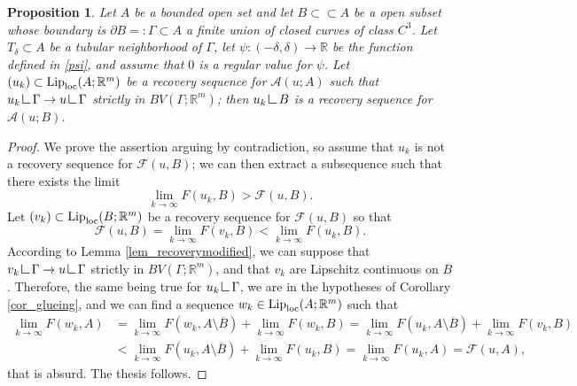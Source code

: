 \documentclass[a4paper,11pt]{article}
\numberwithin{equation}{section}
\newtheorem{prop}[theorem]{Proposition}
\newcommand{\R}{\mathbb{R}}
\newcommand{\res}      {\mathop{\hbox{\vrule height 7pt width .5pt depth
                        0pt\vrule height .5pt width 6pt depth 0pt}}\nolimits}
\begin{document}
\begin{prop}\label{prop:recoveryrestriction}
Let $A$ be a bounded open set and let $B\subset\subset A$ be a open subset whose boundary is $\partial B=:\Gamma\subset A$ a finite union of  closed curves of class $C^3$. Let $T_\delta\subset A$ be a tubular neighborhood of $\Gamma$, let  $\psi:(-\delta,\delta)\rightarrow \R$ be the function defined in \eqref{psi}, and assume that $0$ is a regular value for $\psi$. Let $(u_k)\subset \text{{\rm Lip}}_{\text{{\rm loc}}}(A;\R^m)$ be a recovery sequence for $\mathcal A(u;A)$ such that $u_k\res\Gamma\rightarrow u\res \Gamma$ strictly in $BV(\Gamma;\R^m)$; then $u_k\res B$ is a recovery sequence for $\mathcal A(u;B)$.
\end{prop}
\begin{proof} 
We prove the assertion arguing by contradiction, so assume that $u_k$ is not a recovery sequence for $\mathcal F(u,B)$; we can then extract a subsequence such that there exists the limit 
$$\lim_{k\rightarrow \infty}F(u_k,B)>\mathcal F(u,B).$$
Let  $(v_k)\subset  \text{{\rm Lip}}_{\text{{\rm loc}}}(B;\R^m)$ be a recovery sequence for $\mathcal F(u,B)$ so that 
$$\mathcal F(u,B)=\lim_{k\rightarrow\infty} F(v_k,B)<\lim_{k\rightarrow\infty} F(u_k,B).$$ 
According to Lemma \ref{lem_recoverymodified}, we can suppose that $v_k\res \Gamma \rightarrow u\res \Gamma$ strictly in $BV(\Gamma;\R^m)$, and that $v_k$ are Lipschitz continuous on $B$. Therefore, the same being true for $u_k\res \Gamma$, we are in the hypotheses of Corollary \ref{cor_glueing}, and we can find a sequence $w_k\in \text{{\rm Lip}}_{\text{{\rm loc}}}(A;\R^m)$ such that
\begin{align*}
\lim_{k\rightarrow\infty} F(w_k,A)&=\lim_{k\rightarrow\infty} F(w_k,A\setminus \overline B)+\lim_{k\rightarrow\infty} F(w_k,B)=\lim_{k\rightarrow\infty} F(u_k,A\setminus \overline B)+\lim_{k\rightarrow\infty} F(v_k,B)\nonumber\\
&<\lim_{k\rightarrow\infty} F(u_k,A\setminus \overline B)+\lim_{k\rightarrow\infty} F(u_k,B)=\lim_{k\rightarrow\infty} F(u_k,A)=\mathcal F(u,A),
\end{align*}
that is absurd. The thesis follows.
\end{proof}
\end{document}
